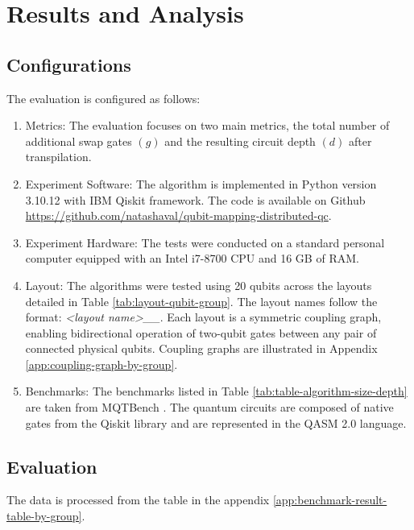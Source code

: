 \chapter{Results and Analysis} \label{Chap4}
\section{Configurations} %
The evaluation is configured as follows:
\begin{enumerate}[nolistsep]
    \item Metrics: The evaluation focuses on two main metrics, the total number of additional swap gates $(g)$ and the resulting circuit depth $(d)$ after transpilation.
    \item Experiment Software: The algorithm is implemented in Python version 3.10.12 with IBM Qiskit framework. The code is available on Github \url{https://github.com/natashaval/qubit-mapping-distributed-qc}.
    \item Experiment Hardware: The tests were conducted on a standard personal computer equipped with an Intel i7-8700 CPU and 16 GB of RAM.
    \item Layout: The algorithms were tested using 20 qubits across the layouts detailed in Table  \ref{tab:layout-qubit-group}. The layout names follow the format: \textit{<layout name>\_<number of qubits>\_<number of groups>}. Each layout is a symmetric coupling graph, enabling bidirectional operation of two-qubit gates between any pair of connected physical qubits. Coupling graphs are illustrated in Appendix \ref{app:coupling-graph-by-group}.
        
    \item Benchmarks: The benchmarks  listed in Table \ref{tab:table-algorithm-size-depth} are taken from MQTBench \cite{quetschlich_mqt_2023}. The quantum circuits are composed of native gates from the Qiskit library and are represented in the QASM 2.0 language.
        
\end{enumerate}

\section{Evaluation}
The data is processed from the table in the appendix \ref{app:benchmark-result-table-by-group}.
